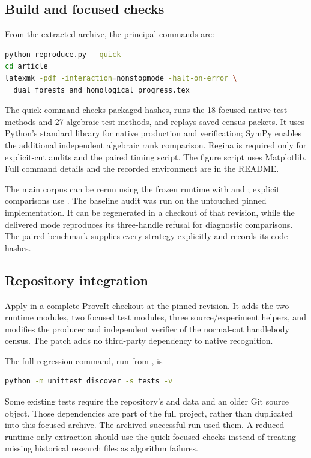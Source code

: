 \subsection{Build and focused checks}

From the extracted archive, the principal commands are:
\begin{lstlisting}[language=bash]
python reproduce.py --quick
cd article
latexmk -pdf -interaction=nonstopmode -halt-on-error \
  dual_forests_and_homological_progress.tex
\end{lstlisting}
The quick command checks packaged hashes, runs the 18 focused native test
methods and 27 algebraic test methods, and replays saved census packets.
It uses Python's standard library for native production and verification;
SymPy enables the additional independent algebraic rank comparison.
Regina is required only for explicit-cut audits and the paired timing
script. The figure script uses Matplotlib. Full command details and the
recorded environment are in the README.

The main corpus can be rerun using the frozen runtime with
 and
; explicit comparisons use
\code{audit\_regina.py}. The baseline audit was run on the untouched
pinned implementation. It can be regenerated in a checkout of that
revision, while the delivered \code{disabled} mode reproduces its
three-handle refusal for diagnostic comparisons. The paired benchmark
supplies every strategy explicitly and records its code hashes.

\subsection{Repository integration}

Apply  in a complete ProveIt checkout
at the pinned revision. It adds the two runtime modules,
two focused test modules, three source/experiment helpers, and modifies
the producer and independent verifier of the normal-cut handlebody census.
The patch adds no third-party dependency to native recognition.

The full regression command, run from
, is
\begin{lstlisting}[language=bash]
python -m unittest discover -s tests -v
\end{lstlisting}
Some existing tests require the repository's  and
\code{synthesis/} data and an older Git source object. Those dependencies
are part of the full project, rather than duplicated into this focused
archive. The archived successful run used them. A reduced runtime-only
extraction should use the quick focused checks instead of treating missing
historical research files as algorithm failures.


